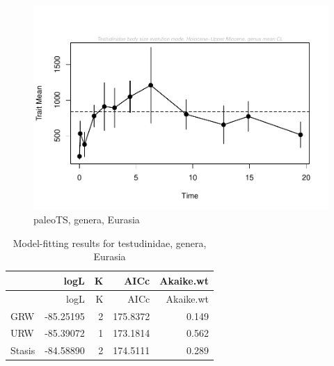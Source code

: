 \begin{figure}[H]
	\centering
	\includegraphics{MA_JJ_files/figure-latex/paleoTSEurasia-1.pdf}
	\caption{paleoTS, genera, Eurasia}
	\label{fig:pTSEs}
\end{figure}

\begin{longtable}[]{@{}lrrrr@{}}
	\caption{Model-fitting results for testudinidae, genera,
		Eurasia}
	\label{tab:pTSEsEM}\tabularnewline
	\toprule
	& logL & K & AICc & Akaike.wt\tabularnewline
	\midrule
	\endfirsthead
	\toprule
	& logL & K & AICc & Akaike.wt\tabularnewline
	\midrule
	\endhead
	GRW & -85.25195 & 2 & 175.8372 & 0.149\tabularnewline
	URW & -85.39072 & 1 & 173.1814 & 0.562\tabularnewline
	Stasis & -84.58890 & 2 & 174.5111 & 0.289\tabularnewline
	\bottomrule
\end{longtable}



\FloatBarrier

